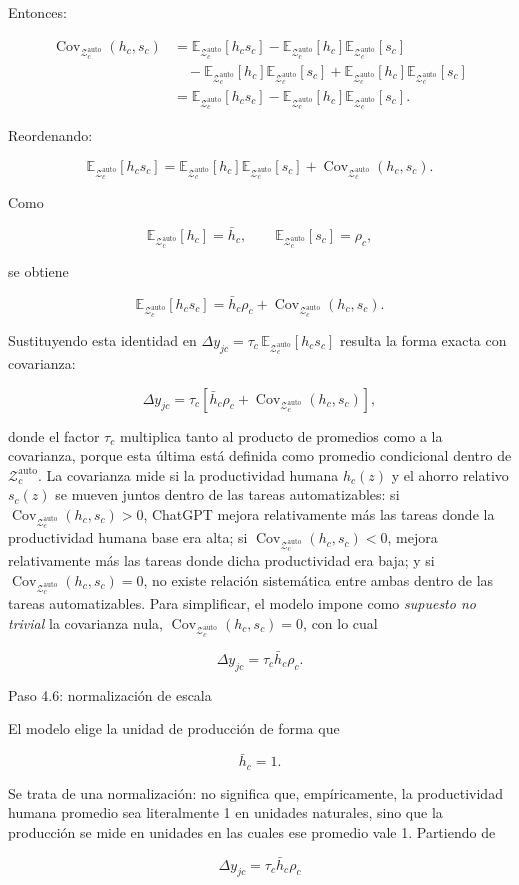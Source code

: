 \documentclass[12pt,a4paper]{article}
\let\textbf\textmd
\newcommand{\Zauto}{\mathcal{Z}^{\mathrm{auto}}_c}
\newcommand{\Eauto}{\mathbb{E}_{\Zauto}}
\newcommand{\Covauto}{\operatorname{Cov}_{\Zauto}}
\begin{document}
Entonces:

\begin{align*}
\Covauto(h_c,s_c)
&=
\Eauto[h_c s_c]
-\Eauto[h_c]\Eauto[s_c]\\
&\quad
-\Eauto[h_c]\Eauto[s_c]
+\Eauto[h_c]\Eauto[s_c]\\
&=
\Eauto[h_c s_c]
-\Eauto[h_c]\Eauto[s_c].
\end{align*}

Reordenando:

\[
\Eauto[h_c s_c]
=
\Eauto[h_c]\Eauto[s_c]
+\Covauto(h_c,s_c).
\]

Como

\[
\Eauto[h_c]=\bar h_c,
\qquad
\Eauto[s_c]=\rho_c,
\]

se obtiene

\[
\Eauto[h_c s_c]
=
\bar h_c\rho_c+\Covauto(h_c,s_c).
\]

Sustituyendo esta identidad en $\Delta y_{jc}=\tau_c\,\Eauto[h_c s_c]$ resulta la forma exacta con covarianza:

\[
\Delta y_{jc}
=
\tau_c\left[
\bar h_c\rho_c+\Covauto(h_c,s_c)
\right],
\]

donde el factor $\tau_c$ multiplica tanto al producto de promedios como a la covarianza, porque esta última está definida como promedio condicional dentro de $\Zauto$. La covarianza mide si la productividad humana $h_c(z)$ y el ahorro relativo $s_c(z)$ se mueven juntos dentro de las tareas automatizables: si $\Covauto(h_c,s_c)>0$, ChatGPT mejora relativamente más las tareas donde la productividad humana base era alta; si $\Covauto(h_c,s_c)<0$, mejora relativamente más las tareas donde dicha productividad era baja; y si $\Covauto(h_c,s_c)=0$, no existe relación sistemática entre ambas dentro de las tareas automatizables. Para simplificar, el modelo impone como \textit{supuesto no trivial} la covarianza nula, $\Covauto(h_c,s_c)=0$, con lo cual

\[
\Delta y_{jc}=\tau_c\bar h_c\rho_c.
\]

\bigskip
\noindent\textbf{Paso 4.6: normalización de escala}

\medskip
\noindent El modelo elige la unidad de producción de forma que

\[
\bar h_c=1.
\]

Se trata de una normalización: no significa que, empíricamente, la productividad humana promedio sea literalmente 1 en unidades naturales, sino que la producción se mide en unidades en las cuales ese promedio vale 1. Partiendo de

\[
\Delta y_{jc}=\tau_c\bar h_c\rho_c
\]
\end{document}
